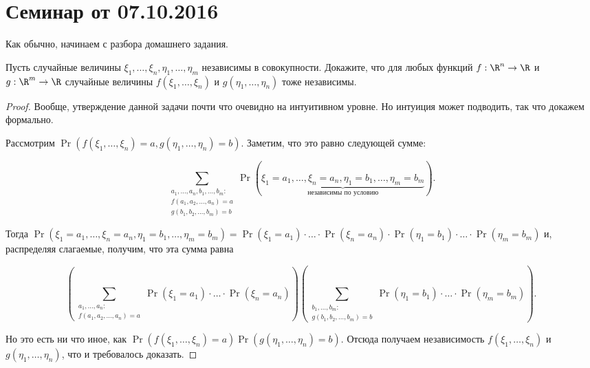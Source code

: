 \section{Семинар от 07.10.2016}
Как обычно, начинаем с разбора домашнего задания.
\begin{problem}
    Пусть случайные величины \(\xi_1, \ldots, \xi_n, \eta_1, \ldots, \eta_m\) независимы в совокупности. Докажите, что для любых функций \(f : \R^n \to \R\) и \(g : \R^m \to \R\) случайные величины \(f(\xi_1, \ldots, \xi_n)\) и \(g(\eta_1, \ldots, \eta_n)\) тоже независимы.
\end{problem}
\begin{proof}
    Вообще, утверждение данной задачи почти что очевидно на интуитивном уровне. Но интуиция может подводить, так что докажем формально.
    
    Рассмотрим \(\Pr(f(\xi_1, \ldots, \xi_n) = a, g(\eta_1, \ldots, \eta_n) = b)\). Заметим, что это равно следующей сумме:
    
    \[\sum_{\substack{a_1, \ldots, a_n, b_1, \ldots, b_m: \\ f(a_1, a_2, \ldots, a_n) = a \\ g(b_1, b_2, \ldots, b_m) = b}} \Pr(\underbrace{\xi_1 = a_1, \ldots, \xi_n = a_n, \eta_1 = b_1, \ldots, \eta_m = b_m}_{\text{независимы по условию}}).\]
    
    Тогда \(\Pr(\xi_1 = a_1, \ldots, \xi_n = a_n, \eta_1 = b_1, \ldots, \eta_m = b_m) = \Pr(\xi_1 = a_1) \cdot \ldots \cdot \Pr(\xi_n = a_n) \cdot \Pr(\eta_1 = b_1) \cdot \ldots \cdot \Pr(\eta_m = b_m)\) и, распределяя слагаемые, получим, что эта сумма равна
    
    \[\left(\sum_{\substack{a_1, \ldots, a_n: \\ f(a_1, a_2, \ldots, a_n) = a}} \Pr(\xi_1 = a_1) \cdot \ldots \cdot \Pr(\xi_n = a_n) \right)\left(\sum_{\substack{b_1, \ldots, b_m: \\ g(b_1, b_2, \ldots, b_m) = b}} \Pr(\eta_1 = b_1) \cdot \ldots \cdot \Pr(\eta_m = b_m)\right).\]
    
    Но это есть ни что иное, как \(\Pr(f(\xi_1, \ldots, \xi_n) = a)\Pr(g(\eta_1, \ldots, \eta_n) = b)\). Отсюда получаем независимость \(f(\xi_1, \ldots, \xi_n)\) и \(g(\eta_1, \ldots, \eta_n)\), что и требовалось доказать.
\end{proof}

